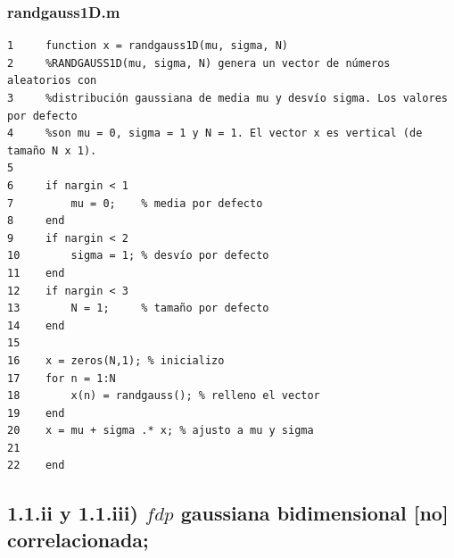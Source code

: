 \documentclass[11pt,a4paper,final]{article}
\begin{document}
\subsubsection*{randgauss1D.m}

\begin{verbatim}
1     function x = randgauss1D(mu, sigma, N)
2     %RANDGAUSS1D(mu, sigma, N) genera un vector de números aleatorios con 
3     %distribución gaussiana de media mu y desvío sigma. Los valores por defecto
4     %son mu = 0, sigma = 1 y N = 1. El vector x es vertical (de tamaño N x 1).
5     
6     if nargin < 1
7         mu = 0;    % media por defecto
8     end
9     if nargin < 2
10        sigma = 1; % desvío por defecto
11    end
12    if nargin < 3
13        N = 1;     % tamaño por defecto
14    end
15    
16    x = zeros(N,1); % inicializo
17    for n = 1:N
18        x(n) = randgauss(); % relleno el vector
19    end
20    x = mu + sigma .* x; % ajusto a mu y sigma
21    
22    end
\end{verbatim} \color{black}
    

\subsection*{1.1.ii y 1.1.iii) $fdp$ gaussiana bidimensional [no] correlacionada;}
\end{document}
